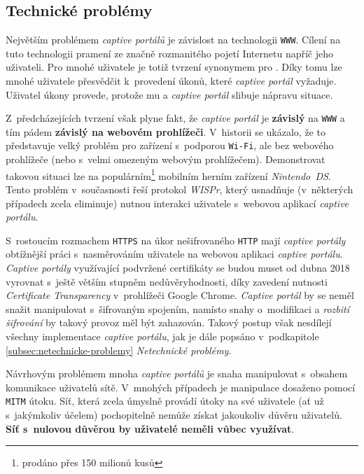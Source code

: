 \documentclass[thesis=M,czech]{FITthesis}[2012/10/20]
\begin{document}
\subsection{Technické problémy}

Největším problémem \textit{captive portálů} je závislost na technologii \texttt{WWW}. Cílení na tuto technologii pramení ze značně rozmanitého pojetí Internetu napříč jeho uživateli. Pro mnohé uživatele je totiž tvrzení  synonymem pro . Díky tomu lze mnohé uživatele přesvědčit k~provedení úkonů, které \textit{captive portál} vyžaduje. Uživatel úkony provede, protože mu  a \textit{captive portál} slibuje nápravu situace.

Z~předcházejících tvrzení však plyne fakt, že \textit{captive portál} je \textbf{závislý} na \texttt{WWW} a tím pádem \textbf{závislý na webovém prohlížeči}. V~historii se ukázalo, že to představuje velký problém pro zařízení s~podporou \texttt{Wi-Fi}, ale bez webového prohlížeče (nebo s~velmi omezeným webovým prohlížečem). Demonstrovat takovou situaci lze na populárním\footnote{prodáno přes 150 milionů kusů\cite{nintendo-sales}} mobilním herním zařízení \textit{Nintendo~DS}. Tento problém v~současnosti řeší protokol \textit{WISPr}\cite{wispr-specs}, který usnadňuje (v~některých případech zcela eliminuje) nutnou interakci uživatele s~webovou aplikací \textit{captive portálu}.

S~rostoucím rozmachem \texttt{HTTPS} na úkor nešifrovaného \texttt{HTTP} mají \textit{captive portály} obtížnější práci s~nasměrováním uživatele na webovou aplikaci \textit{captive portálu}. \textit{Captive portály} využívající podvržené certifikáty se budou muset od dubna 2018 vyrovnat s~ještě větším stupněm nedůvěryhodnosti, díky zavedení nutnosti \textit{Certificate Transparency} v~prohlížeči Google Chrome\cite{google-mandatory-cert-transp}. \textit{Captive portál} by se neměl snažit manipulovat s~šifrovaným spojením, namísto snahy o~modifikaci a \textit{rozbití šifrování} by takový provoz měl být zahazován. Takový postup však nesdílejí všechny implementace \textit{captive portálu}, jak je dále popsáno v~podkapitole \ref{subsec:netechnicke-problemy} \textit{Netechnické problémy}.

Návrhovým problémem mnoha \textit{captive portálů} je snaha manipulovat s~obsahem komunikace uživatelů sítě. V~mnohých případech je manipulace dosaženo pomocí \texttt{MITM} útoku. Síť, která zcela úmyslně provádí útoky na své uživatele (ať už s~jakýmkoliv účelem) pochopitelně nemůže získat jakoukoliv důvěru uživatelů. \textbf{Síť s~nulovou důvěrou by uživatelé neměli vůbec využívat}.
\end{document}
